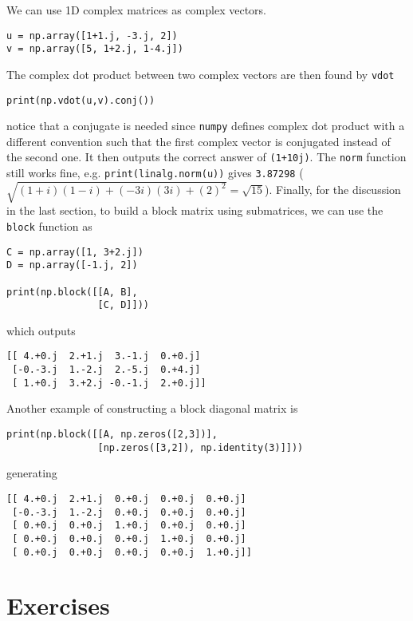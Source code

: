 We can use 1D complex matrices as complex vectors.
\begin{lstlisting}
u = np.array([1+1.j, -3.j, 2])
v = np.array([5, 1+2.j, 1-4.j])    
\end{lstlisting}
The complex dot product between two complex vectors are then found by \verb|vdot|
\begin{lstlisting}
print(np.vdot(u,v).conj()) 
\end{lstlisting}
notice that a conjugate is needed since \verb|numpy| defines complex dot product with a different convention such that the first complex vector is conjugated instead of the second one. It then outputs the correct answer of \verb|(1+10j)|. The \verb|norm| function still works fine, e.g. \verb|print(linalg.norm(u))| gives \verb|3.87298| ($\sqrt{(1+i)(1-i) + (-3i)(3i) + (2)^2} = \sqrt{15}$). Finally, for the discussion in the last section, to build a block matrix using submatrices, we can use the \verb|block| function as
\begin{lstlisting}
C = np.array([1, 3+2.j])
D = np.array([-1.j, 2])

print(np.block([[A, B],
                [C, D]]))
\end{lstlisting}
which outputs
\begin{lstlisting}
[[ 4.+0.j  2.+1.j  3.-1.j  0.+0.j]
 [-0.-3.j  1.-2.j  2.-5.j  0.+4.j]
 [ 1.+0.j  3.+2.j -0.-1.j  2.+0.j]]    
\end{lstlisting}
Another example of constructing a block diagonal matrix is
\begin{lstlisting}
print(np.block([[A, np.zeros([2,3])],
                [np.zeros([3,2]), np.identity(3)]]))    
\end{lstlisting}
generating
\begin{lstlisting}
[[ 4.+0.j  2.+1.j  0.+0.j  0.+0.j  0.+0.j]
 [-0.-3.j  1.-2.j  0.+0.j  0.+0.j  0.+0.j]
 [ 0.+0.j  0.+0.j  1.+0.j  0.+0.j  0.+0.j]
 [ 0.+0.j  0.+0.j  0.+0.j  1.+0.j  0.+0.j]
 [ 0.+0.j  0.+0.j  0.+0.j  0.+0.j  1.+0.j]]    
\end{lstlisting}

\section{Exercises}

